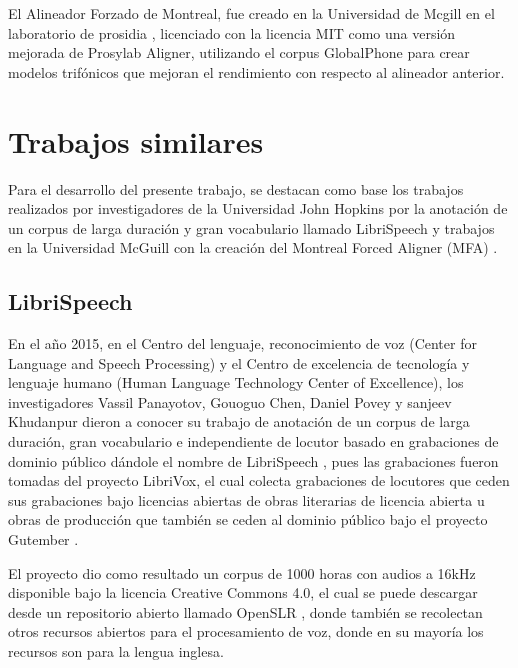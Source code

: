El Alineador Forzado de Montreal, fue creado en la Universidad de Mcgill en el laboratorio de prosidia \cite{McAuliffe2017MontrealKaldi}, licenciado con la licencia MIT  como una versión mejorada de Prosylab Aligner, utilizando el corpus GlobalPhone  para crear modelos trifónicos que mejoran el rendimiento con respecto al alineador anterior.

\section{Trabajos similares}

Para el desarrollo del presente trabajo, se destacan como base los trabajos realizados por investigadores de la Universidad John Hopkins por la anotación de un corpus de larga duración y gran vocabulario llamado LibriSpeech \cite{PanayotovLIBRISPEECH:BOOKS} y trabajos en la Universidad McGuill con la creación del Montreal Forced Aligner (MFA) \cite{McAuliffe2017MontrealKaldi}.

\subsection{LibriSpeech}


En el año 2015, en el Centro del lenguaje, reconocimiento de voz (Center for Language and Speech Processing) y el Centro de excelencia de tecnología y lenguaje humano (Human Language Technology Center of Excellence), los investigadores Vassil Panayotov, Gouoguo Chen, Daniel Povey y sanjeev Khudanpur dieron a conocer su trabajo de anotación de un corpus de larga duración, gran vocabulario e independiente de locutor basado en grabaciones de dominio público dándole el nombre de LibriSpeech \cite{PanayotovLIBRISPEECH:BOOKS}, pues las grabaciones fueron tomadas del proyecto LibriVox, el cual colecta grabaciones de locutores que ceden sus grabaciones bajo licencias abiertas de obras literarias de licencia abierta u obras de producción que también se ceden al dominio público bajo el proyecto Gutember \cite{gutenberg}.

El proyecto dio como resultado un corpus de 1000 horas con audios a 16kHz disponible bajo la licencia Creative Commons 4.0, el cual se puede descargar desde un repositorio abierto llamado OpenSLR \cite{openSLR}, donde también se recolectan otros recursos abiertos para el procesamiento de voz, donde en su mayoría los recursos son para la lengua inglesa.

